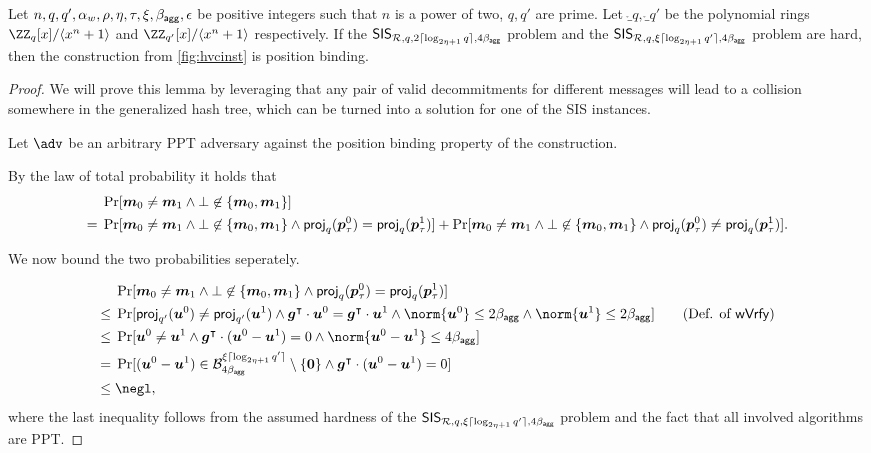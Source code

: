 \begin{lemma}\label{lem:hvcposbind}
  Let $n,q,q',\alpha_w,\rho,\eta,\tau,\xi,\beta_{\mathsf{agg}},\epsilon$ be positive integers such that $n$ is a power of two, $q,q'$ are prime.
  Let $\ring_q,\ring_{q'}$ be the polynomial rings $\ZZ_q[x]/\langle x^n+1\rangle$ and $\ZZ_{q'}[x]/\langle x^n+1\rangle$ respectively.
  If the $\mathsf{SIS}_{\mathcal{R},q,2\lceil \log_{2\eta+1} q \rceil,4\beta_{\mathsf{agg}}}$ problem and the $\mathsf{SIS}_{\mathcal{R},q,\xi\lceil \log_{2\eta+1} q' \rceil,4\beta_{\mathsf{agg}}}$ problem are hard, then the construction from \autoref{fig:hvcinst} is position binding.
\end{lemma}
\begin{proof}
We will prove this lemma by leveraging that any pair of valid decommitments for different messages will lead to a collision somewhere in the generalized hash tree, which can be turned into a solution for one of the SIS instances. 

  Let $\adv$ be an arbitrary PPT adversary against the position binding property of the construction.
  
  By the law of total probability it holds that
  \begin{align*}
    &\Pr[\boldsymbol{m}_0\neq \boldsymbol{m}_1 \land \bot\not\in\{\boldsymbol{m}_0,\boldsymbol{m}_1\}]\\
    ={}& \Pr[\boldsymbol{m}_0\neq \boldsymbol{m}_1 \land \bot\not\in\{\boldsymbol{m}_0,\boldsymbol{m}_1\} \land \mathsf{proj}_q(\boldsymbol{p}_\tau^0) = \mathsf{proj}_q(\boldsymbol{p}_\tau^1)] + \Pr[\boldsymbol{m}_0\neq \boldsymbol{m}_1 \land \bot\not\in\{\boldsymbol{m}_0,\boldsymbol{m}_1\} \land \mathsf{proj}_q(\boldsymbol{p}_\tau^0) \neq \mathsf{proj}_q(\boldsymbol{p}_\tau^1)].
  \end{align*}
  
  We now bound the two probabilities seperately.
  
  \begin{align*}
    &\Pr[\vec{m}_0\neq \vec{m}_1 \land \bot\not\in\{\vec{m}_0,\vec{m}_1\} \land \proj_q(\vec{p}_\tau^0) = \proj_q(\vec{p}_\tau^1)]\\
    \leq{}&\Pr[\proj_{q'}(\vec{u}^0) \neq \proj_{q'}(\vec{u}^1) \land \vec{g}^\intercal\cdot \vec{u}^0 = \vec{g}^\intercal\cdot \vec{u}^1 \land \norm{\vec{u}^0}\leq 2\bagg \land \norm{\vec{u}^1}\leq 2\bagg]\tag{Def. of $\wverify$}\\
    \leq{}& \Pr[\vec{u}^0 \neq \vec{u}^1 \land \vec{g}^\intercal\cdot (\vec{u}^0-\vec{u}^1) = 0 \land \norm{\vec{u}^0-\vec{u}^1}\leq 4\bagg]\\
    = {}& \Pr[(\vec{u}^0-\vec{u}^1) \in \ball_{4\bagg}^{\xi\lceil\log_{2\eta+1}q'\rceil}\setminus \{\vec{0}\} \land \vec{g}^\intercal\cdot (\vec{u}^0-\vec{u}^1) = 0]\\
    \leq{}& \negl,
  \end{align*}
  where the last inequality follows from the assumed hardness of the $\mathsf{SIS}_{\mathcal{R},q,\xi\lceil \log_{2\eta+1} q' \rceil,4\beta_{\mathsf{agg}}}$ problem and the fact that all involved algorithms are PPT.
  

\end{proof}
